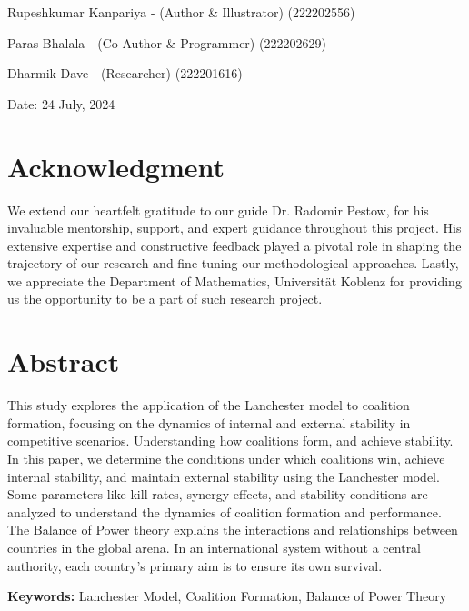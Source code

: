 \documentclass[oneside,12pt]{report}
\begin{document}
		
\vspace{1cm}
\begin{flushright}
Rupeshkumar Kanpariya - (Author \& Illustrator) (222202556) \par
Paras Bhalala - (Co-Author \& Programmer) (222202629) \par
Dharmik Dave - (Researcher) (222201616) \par
\vspace{1cm} 
 Date: 24 July, 2024 \par
\end{flushright}


\newpage
 
\section*{Acknowledgment}
\vspace{0.5cm}
We extend our heartfelt gratitude to our guide Dr. Radomir Pestow, for his invaluable mentorship, support, and expert guidance throughout this project. His extensive expertise and constructive feedback played a pivotal role in shaping the trajectory of our research and fine-tuning our methodological approaches. Lastly, we appreciate the Department of Mathematics, Universität Koblenz for providing us the opportunity to be a part of such research project.


\newpage

\section*{Abstract}
\vspace{0.5cm}

This study explores the application of the Lanchester model to coalition formation, focusing on the dynamics of internal and external stability in competitive scenarios. Understanding how coalitions form, and achieve stability. In this paper, we determine the conditions under which coalitions win, achieve internal stability, and maintain external stability using the Lanchester model. Some parameters like kill rates, synergy effects, and stability conditions are analyzed to understand the dynamics of coalition formation and performance. The Balance of Power theory explains the interactions and relationships between countries in the global arena. In an international system without a central authority, each country's primary aim is to ensure its own survival.

\textbf{Keywords:} Lanchester Model, Coalition Formation, Balance of Power Theory
\end{document}
